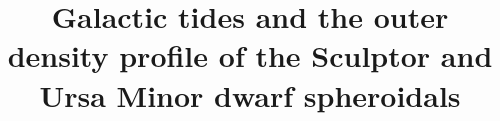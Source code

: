 \documentclass[times,trackchanges, twocolumn, twocolappendix]{aastex701}
\begin{document}
\title{Galactic tides and the outer density profile of the Sculptor and Ursa Minor dwarf spheroidals}

\end{document}
